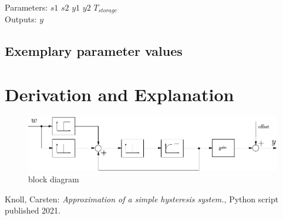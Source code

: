 \documentclass[10pt,a4paper]{article}
\begin{document}
	\noindent
	Parameters: $s1$ $s2$ $y1$ $y2$ $T_{storage}$%
	\\
	Outputs: $y$ %
	
	
	
	\subsection{Exemplary parameter values}
	

	
	\section{Derivation and Explanation} %
	\begin{figure}[H]
		\centering
		\includegraphics[width=\linewidth]{hysteresis.pdf}
		\caption{block diagram}
	\end{figure}
	
	
	
	\begin{thebibliography}{10}		
		Knoll, Carsten: 
		\textit{Approximation of a simple hysteresis system.}, Python script published 2021.
	\end{thebibliography}
\end{document}
